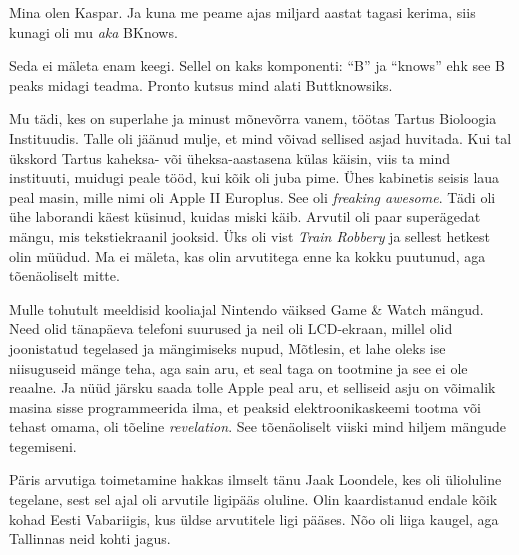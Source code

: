 

Mina olen Kaspar. Ja kuna me peame ajas miljard aastat tagasi kerima, siis 
kunagi oli mu \emph{aka} BKnows. 


Seda ei mäleta enam keegi. Sellel on kaks komponenti: 
\enquote{B} ja \enquote{knows} ehk see B peaks midagi 
teadma. Pronto kutsus mind alati Buttknowsiks.


Mu tädi, kes on superlahe ja minust mõnevõrra vanem, 
töötas Tartus Bioloogia Instituudis. Talle oli jäänud mulje, et mind võivad 
sellised asjad huvitada. Kui tal ükskord Tartus kaheksa- või üheksa-aastasena
külas käisin, viis ta mind instituuti, muidugi peale tööd, kui kõik oli juba 
pime. 
Ühes kabinetis seisis laua peal masin, mille nimi oli Apple II 
Europlus. See oli \emph{freaking awesome}. 
Tädi oli ühe laborandi käest küsinud, kuidas miski käib. Arvutil oli paar 
superägedat mängu, mis tekstiekraanil jooksid. Üks oli vist \emph{Train 
Robbery} ja sellest hetkest olin müüdud. Ma ei mäleta, kas 
olin arvutitega enne ka kokku puutunud, aga tõenäoliselt mitte. 

Mulle tohutult meeldisid kooliajal Nintendo väiksed Game \& 
Watch mängud. Need olid tänapäeva 
telefoni suurused ja neil oli LCD-ekraan, millel olid joonistatud 
tegelased ja mängimiseks nupud, Mõtlesin, et 
lahe oleks ise niisuguseid mänge teha, aga sain aru, et seal taga 
on tootmine ja see ei ole reaalne. Ja nüüd järsku saada tolle Apple peal aru, 
et 
selliseid asju on võimalik masina sisse programmeerida ilma, et peaksid 
elektroonikaskeemi tootma või tehast omama, oli tõeline
\emph{revelation}. See tõenäoliselt viiski mind hiljem
mängude tegemiseni. 

Päris arvutiga toimetamine hakkas ilmselt tänu Jaak 
Loondele, kes oli ülioluline tegelane, sest 
sel ajal oli arvutile ligipääs oluline. 
Olin kaardistanud endale kõik kohad Eesti Vabariigis, kus üldse 
arvutitele ligi pääses. Nõo oli liiga kaugel, aga Tallinnas neid kohti jagus. 

